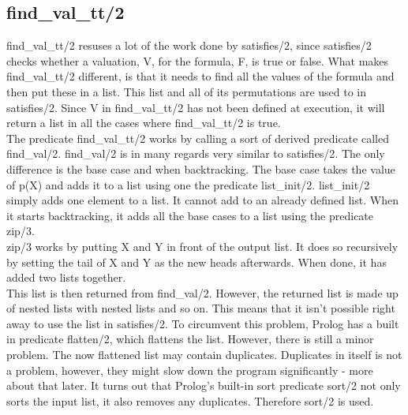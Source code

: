 \documentclass[a4paper,10pt]{article}
\begin{document}
\subsection{find\_val\_tt/2}
\textsf{find\_val\_tt/2} resuses a lot of the work done by \textsf{satisfies/2}, since  \textsf{satisfies/2} checks whether a valuation, V, for the formula, F, is true or false. What makes \textsf{find\_val\_tt/2} different, is that it needs to find all the values of the formula and then put these in a list. This list and all of its permutations are used to in \textsf{satisfies/2}. Since V in \textsf{find\_val\_tt/2} has not been defined at execution, it will return a list in all the cases where \textsf{find\_val\_tt/2} is true.\\
The predicate \textsf{find\_val\_tt/2} works by calling a sort of derived predicate called \textsf{find\_val/2}. \textsf{find\_val/2} is in many regards very similar to \textsf{satisfies/2}. The only difference is the base case and when backtracking. The base case takes the value of \textsf{p(X)} and adds it to a list using one the predicate \textsf{list\_init/2}. \textsf{list\_init/2} simply adds one element to a list. It cannot add to an already defined list. When it starts backtracking, it adds all the base cases to a list using the predicate \textsf{zip/3}.\\
\textsf{zip/3} works by putting X and Y in front of the output list. It does so recursively by setting the tail of X and Y as the new heads afterwards. When done, it has added two lists together.\\
This list is then returned from \textsf{find\_val/2}. However, the returned list is made up of nested lists with nested lists and so on. This means that it isn't possible right away to use the list in \textsf{satisfies/2}. To circumvent this problem, Prolog has a built in predicate \textsf{flatten/2}, which flattens the list. However, there is still a minor problem. The now flattened list may contain duplicates. Duplicates in itself is not a problem, however, they might slow down the program significantly - more about that later. It turns out that Prolog's built-in sort predicate \textsf{sort/2} not only sorts the input list, it also removes any duplicates. Therefore \textsf{sort/2} is used.\\
\end{document}
